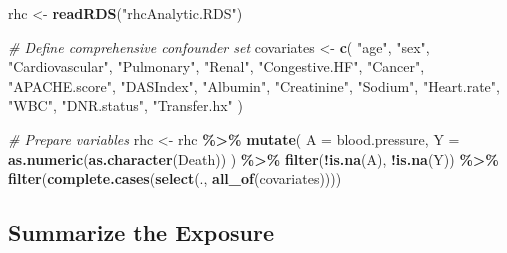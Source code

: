 \documentclass[
]{article}
\newenvironment{Shaded}{\begin{snugshade}}{\end{snugshade}}
\newcommand{\AttributeTok}[1]{\textcolor[rgb]{0.13,0.29,0.53}{#1}}
\newcommand{\CommentTok}[1]{\textcolor[rgb]{0.56,0.35,0.01}{\textit{#1}}}
\newcommand{\FunctionTok}[1]{\textcolor[rgb]{0.13,0.29,0.53}{\textbf{#1}}}
\newcommand{\NormalTok}[1]{#1}
\newcommand{\OtherTok}[1]{\textcolor[rgb]{0.56,0.35,0.01}{#1}}
\newcommand{\SpecialCharTok}[1]{\textcolor[rgb]{0.81,0.36,0.00}{\textbf{#1}}}
\newcommand{\StringTok}[1]{\textcolor[rgb]{0.31,0.60,0.02}{#1}}
\begin{document}
\begin{Shaded}
\begin{Highlighting}[]
\NormalTok{rhc }\OtherTok{\textless{}{-}} \FunctionTok{readRDS}\NormalTok{(}\StringTok{"rhcAnalytic.RDS"}\NormalTok{)}

\CommentTok{\# Define comprehensive confounder set}
\NormalTok{covariates }\OtherTok{\textless{}{-}} \FunctionTok{c}\NormalTok{(}
  \StringTok{"age"}\NormalTok{, }\StringTok{"sex"}\NormalTok{, }\StringTok{"Cardiovascular"}\NormalTok{, }\StringTok{"Pulmonary"}\NormalTok{, }
  \StringTok{"Renal"}\NormalTok{, }\StringTok{"Congestive.HF"}\NormalTok{, }\StringTok{"Cancer"}\NormalTok{,}
  \StringTok{"APACHE.score"}\NormalTok{, }\StringTok{"DASIndex"}\NormalTok{, }\StringTok{"Albumin"}\NormalTok{, }
  \StringTok{"Creatinine"}\NormalTok{, }\StringTok{"Sodium"}\NormalTok{, }\StringTok{"Heart.rate"}\NormalTok{, }\StringTok{"WBC"}\NormalTok{,}
  \StringTok{"DNR.status"}\NormalTok{, }\StringTok{"Transfer.hx"}
\NormalTok{)}

\CommentTok{\# Prepare variables}
\NormalTok{rhc }\OtherTok{\textless{}{-}}\NormalTok{ rhc }\SpecialCharTok{\%\textgreater{}\%}
  \FunctionTok{mutate}\NormalTok{(}
    \AttributeTok{A =}\NormalTok{ blood.pressure,}
    \AttributeTok{Y =} \FunctionTok{as.numeric}\NormalTok{(}\FunctionTok{as.character}\NormalTok{(Death))}
\NormalTok{  ) }\SpecialCharTok{\%\textgreater{}\%}
  \FunctionTok{filter}\NormalTok{(}\SpecialCharTok{!}\FunctionTok{is.na}\NormalTok{(A), }\SpecialCharTok{!}\FunctionTok{is.na}\NormalTok{(Y)) }\SpecialCharTok{\%\textgreater{}\%}
  \FunctionTok{filter}\NormalTok{(}\FunctionTok{complete.cases}\NormalTok{(}\FunctionTok{select}\NormalTok{(., }\FunctionTok{all\_of}\NormalTok{(covariates))))}
\end{Highlighting}
\end{Shaded}

\subsection{Summarize the Exposure}\label{summarize-the-exposure}
\end{document}
